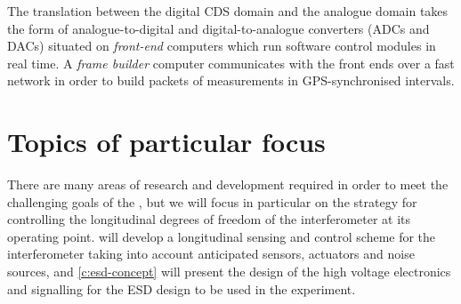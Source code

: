 The translation between the digital \gls{CDS} domain and the analogue domain takes the form of analogue-to-digital and digital-to-analogue converters (\glspl{ADC} and \glspl{DAC}) situated on \emph{front-end} computers which run software control modules in real time. A \emph{frame builder} computer communicates with the front ends over a fast network in order to build packets of measurements in \gls{GPS}-synchronised intervals.

\section{Topics of particular focus}
There are many areas of research and development required in order to meet the challenging goals of the \SSMEXPT{}, but we will focus in particular on the strategy for controlling the longitudinal degrees of freedom of the interferometer at its operating point.  will develop a longitudinal sensing and control scheme for the interferometer taking into account anticipated sensors, actuators and noise sources, and \cref{c:esd-concept} will present the design of the high voltage electronics and signalling for the \gls{ESD} design to be used in the experiment.